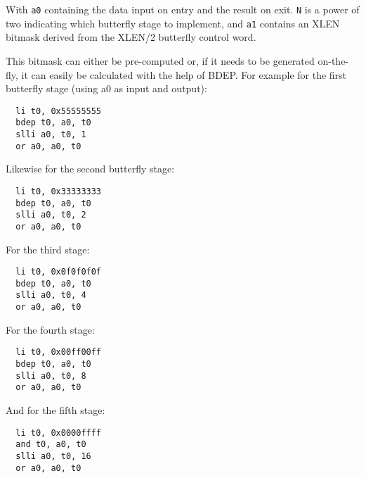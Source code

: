 With {\tt a0} containing the data input on entry and the result on exit. {\tt N} is a
power of two indicating which butterfly stage to implement, and {\tt a1} contains
an XLEN bitmask derived from the XLEN/2 butterfly control word.

This bitmask can either be pre-computed or, if it needs to be generated
on-the-fly, it can easily be calculated with the help of BDEP. For example
for the first butterfly stage (using a0 as input and output):

\begin{verbatim}
  li t0, 0x55555555
  bdep t0, a0, t0
  slli a0, t0, 1
  or a0, a0, t0
\end{verbatim}

Likewise for the second butterfly stage:

\begin{verbatim}
  li t0, 0x33333333
  bdep t0, a0, t0
  slli a0, t0, 2
  or a0, a0, t0
\end{verbatim}

For the third stage:

\begin{verbatim}
  li t0, 0x0f0f0f0f
  bdep t0, a0, t0
  slli a0, t0, 4
  or a0, a0, t0
\end{verbatim}

For the fourth stage:

\begin{verbatim}
  li t0, 0x00ff00ff
  bdep t0, a0, t0
  slli a0, t0, 8
  or a0, a0, t0
\end{verbatim}

And for the fifth stage:

\begin{verbatim}
  li t0, 0x0000ffff
  and t0, a0, t0
  slli a0, t0, 16
  or a0, a0, t0
\end{verbatim}
